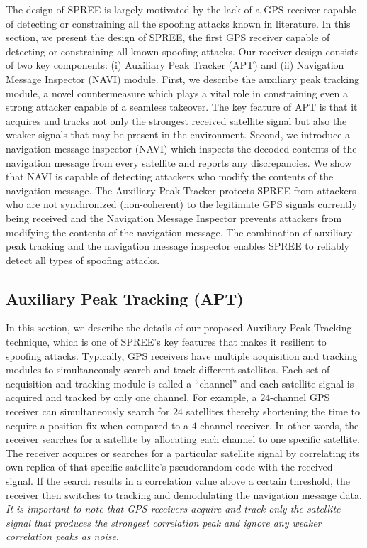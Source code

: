 \documentclass[letterpaper,twocolumn,10pt]{article}
\newcommand{\rxname}{SPREE\xspace}
\begin{document}
The design of \rxname is largely motivated by the lack of a GPS receiver capable of detecting or constraining all the spoofing attacks known in literature. In this section, we present the design of \rxname, the first GPS receiver capable of detecting or constraining all known spoofing attacks. Our receiver design consists of two key components: (i) Auxiliary Peak Tracker (APT) and (ii) Navigation Message Inspector (NAVI) module. First, we describe the auxiliary peak tracking module, a novel countermeasure which plays a vital role in constraining even a strong attacker capable of a seamless takeover. The key feature of APT is that it acquires and tracks not only the strongest received satellite signal but also the weaker signals that may be present in the environment. Second, we introduce a navigation message inspector (NAVI) which inspects the decoded contents of the navigation message from every satellite and reports any discrepancies. We show that NAVI is capable of detecting attackers who modify the contents of the navigation message. The Auxiliary Peak Tracker protects \rxname from attackers who are not synchronized (non-coherent) to the legitimate GPS signals currently being received and the Navigation Message Inspector prevents attackers from modifying the contents of the navigation message. The combination of auxiliary peak tracking and the navigation message inspector enables \rxname to reliably detect all types of spoofing attacks. 

\subsection{Auxiliary Peak Tracking (APT)}
In this section, we describe the details of our proposed Auxiliary Peak Tracking technique, which is one of \rxname's key features that makes it resilient to spoofing attacks. Typically, GPS receivers have multiple acquisition and tracking modules to simultaneously search and track different satellites. Each set of acquisition and tracking module is called a “channel” and each satellite signal is acquired and tracked by only one channel. For example, a $24$-channel GPS receiver can simultaneously search for $24$ satellites thereby shortening the time to acquire a position fix when compared to a $4$-channel receiver. In other words, the receiver searches for a satellite by allocating each channel to one specific satellite. The receiver acquires or searches for a particular satellite signal by correlating its own replica of that specific satellite's pseudorandom code with the received signal. If the search results in a correlation value above a certain threshold, the receiver then switches to tracking and demodulating the navigation message data. \textit{It is important to note that GPS receivers acquire and track only the satellite signal that produces the strongest correlation peak and ignore any weaker correlation peaks as noise}.
\end{document}
